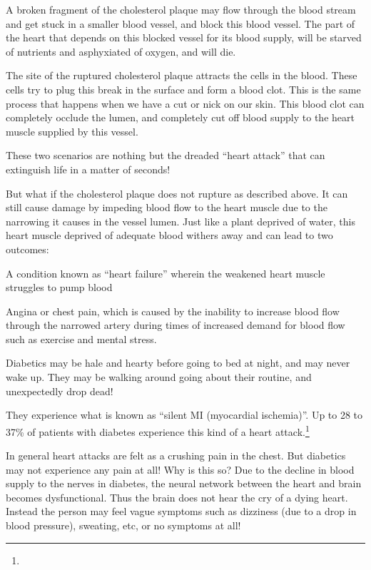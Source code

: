 {\item A broken fragment of the cholesterol plaque may flow through the blood stream and get stuck in a smaller blood vessel, and block this blood vessel. The part of the heart that depends on this blocked vessel for its blood supply, will be starved of nutrients and asphyxiated of oxygen, and will die.

 \item The site of the ruptured cholesterol plaque attracts the cells in the blood. These cells try to plug this break in the surface and form a blood clot. This is the same process that happens when we have a cut or nick on our skin. This blood clot can completely occlude the lumen, and completely cut off blood supply to the heart muscle supplied by this vessel.

These two scenarios are nothing but the dreaded “heart attack” that can extinguish life in a matter of seconds!

But what if the cholesterol plaque does not rupture as described above. It can still cause damage by impeding blood flow to the heart muscle due to the narrowing it causes in the vessel lumen. Just like a plant deprived of water, this heart muscle deprived of adequate blood withers away and can lead to two outcomes:

\item A condition known as “heart failure” wherein the weakened heart muscle struggles to pump blood

 \item Angina or chest pain, which is caused by the inability to increase blood flow through the narrowed artery during times of increased demand for blood flow such as exercise and mental stress.


Diabetics may be hale and hearty before going to bed at night, and may never wake up. They may be walking around going about their routine, and unexpectedly drop dead!

They experience what is known as “silent MI (myocardial ischemia)”. Up to 28 to 37\% of patients with diabetes experience this kind of a heart attack.\footnote{}

In general heart attacks are felt as a crushing pain in the chest. But diabetics may not experience any pain at all! Why is this so? Due to the decline in blood supply to the nerves in diabetes, the neural network between the heart and brain becomes dysfunctional. Thus the brain does not hear the cry of a dying heart. Instead the person may feel vague symptoms such as dizziness (due to a drop in blood pressure), sweating, etc, or no symptoms at all!

}
